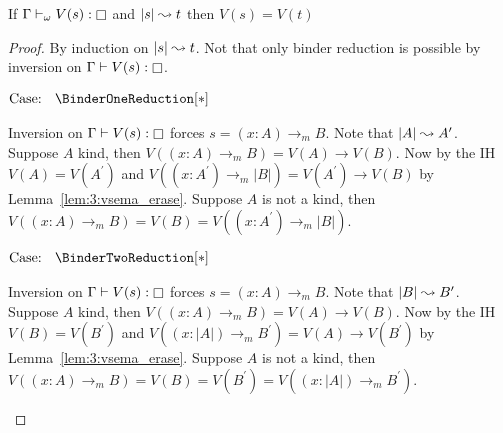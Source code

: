 \begin{lemma}
    \label{lem:3:vsema_erase_red_step}
    If $\Gamma \vdash_\omega V(s) : \kind$ and $|s| \leadsto t$ then $V(s) = V(t)$
\end{lemma}
\begin{proof}
    By induction on $|s| \leadsto t$.
    Not that only binder reduction is possible by inversion on $\Gamma \vdash V(s) : \kind$.

    $\text{Case: }\begin{array}{c} \BinderOneReduction[*] \end{array}$
    \begin{proofcase}
        Inversion on $\Gamma \vdash V(s) : \kind$ forces $s = (x : A) \to_m B$.
        Note that $|A| \leadsto A^\prime$.
        Suppose $A$ kind, then $V((x : A) \to_m B) = V(A) \to V(B)$.
        Now by the IH $V(A) = V(A^\prime)$ and $V((x : A^\prime) \to_m |B|) = V(A^\prime) \to V(B)$ by Lemma~\ref{lem:3:vsema_erase}.
        Suppose $A$ is not a kind, then $V((x : A) \to_m B) = V(B) = V((x : A^\prime) \to_m |B|)$.
    \end{proofcase}

    $\text{Case: }\begin{array}{c} \BinderTwoReduction[*] \end{array}$
    \begin{proofcase}
        Inversion on $\Gamma \vdash V(s) : \kind$ forces $s = (x : A) \to_m B$.
        Note that $|B| \leadsto B^\prime$.
        Suppose $A$ kind, then $V((x : A) \to_m B) = V(A) \to V(B)$.
        Now by the IH $V(B) = V(B^\prime)$ and $V((x : |A|) \to_m B^\prime) = V(A) \to V(B^\prime)$ by Lemma~\ref{lem:3:vsema_erase}.
        Suppose $A$ is not a kind, then $V((x : A) \to_m B) = V(B) = V(B^\prime) = V((x : |A|) \to_m B^\prime)$.
    \end{proofcase}
\end{proof}

